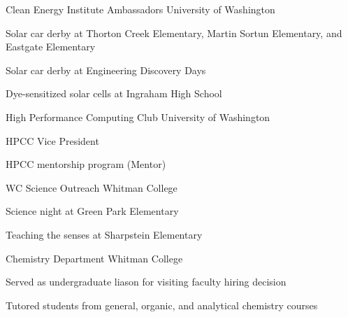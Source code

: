 


\begin{cventries}

\cventry
  {}
  {Clean Energy Institute Ambassadors} %
  {University of Washington} %
  {}
  {
    \begin{cvitems}
      \item{Solar car derby at Thorton Creek Elementary, Martin Sortun 
	    Elementary, and Eastgate Elementary}
      \item{Solar car derby at Engineering Discovery Days}
      \item{Dye-sensitized solar cells at Ingraham High School}
    \end{cvitems}
  }

\cventry
  {}
  {High Performance Computing Club} %
  {University of Washington} %
  {}
  {
    \begin{cvitems}
	  \item{HPCC Vice President}
      \item{HPCC mentorship program (Mentor)}
    \end{cvitems}
  }
   
\cventry
  {}
  {WC Science Outreach} %
  {Whitman College} %
  {}
  {
    \begin{cvitems}
      \item{Science night at Green Park Elementary}
      \item{Teaching the senses at Sharpstein Elementary}
    \end{cvitems}
  }

\cventry
  {}
  {Chemistry Department} %
  {Whitman College} %
  {}
  {
    \begin{cvitems}
      \item{Served as undergraduate liason for visiting faculty hiring decision}
      \item{Tutored students from general, organic, and analytical chemistry courses}
    \end{cvitems}
  }

\end{cventries}
